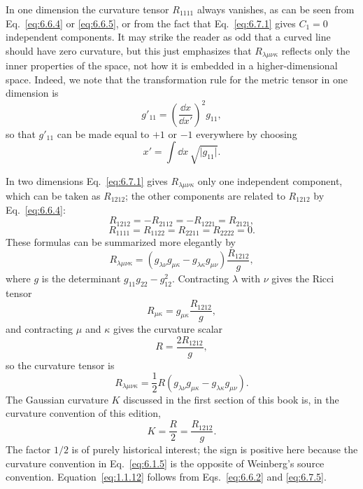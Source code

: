 In one dimension the curvature tensor \(R_{1111}\) always vanishes, as can
be seen from Eq.~\eqref{eq:6.6.4} or \eqref{eq:6.6.5}, or from the fact that
Eq.~\eqref{eq:6.7.1} gives \(C_1=0\) independent components. It may strike
the reader as odd that a curved line should have zero curvature, but this just
emphasizes that \(R_{\lambda\mu\nu\kappa}\) reflects only the inner
properties of the space, not how it is embedded in a higher-dimensional
space. Indeed, we note that the transformation rule for the metric tensor in
one dimension is
\[
  g'_{11}
  =
  \left(\frac{\dd x}{\dd x'}\right)^2g_{11},
\]
so that \(g'_{11}\) can be made equal to \(+1\) or \(-1\) everywhere by
choosing
\[
  x'=\int\dd x\,\sqrt{\lvert g_{11}\rvert}.
\]

In two dimensions Eq.~\eqref{eq:6.7.1} gives
\(R_{\lambda\mu\nu\kappa}\) only one independent component, which can be
taken as \(R_{1212}\); the other components are related to \(R_{1212}\) by
Eq.~\eqref{eq:6.6.4}:
\[
  R_{1212}
  =
  -R_{2112}
  =
  -R_{1221}
  =
  R_{2121},
\]
\[
  R_{1111}=R_{1122}=R_{2211}=R_{2222}=0.
\]
These formulas can be summarized more elegantly by
\[
  R_{\lambda\mu\nu\kappa}
  =
  (g_{\lambda\nu}g_{\mu\kappa}
   -g_{\lambda\kappa}g_{\mu\nu})
  \frac{R_{1212}}{g},
\]
where \(g\) is the determinant \(g_{11}g_{22}-g_{12}^2\). Contracting
\(\lambda\) with \(\nu\) gives the Ricci tensor
\begin{equation}
  R_{\mu\kappa}
  =
  g_{\mu\kappa}\frac{R_{1212}}{g},
  \tag{6.7.2}\label{eq:6.7.2}
\end{equation}
and contracting \(\mu\) and \(\kappa\) gives the curvature scalar
\begin{equation}
  R
  =
  \frac{2R_{1212}}{g},
  \tag{6.7.3}\label{eq:6.7.3}
\end{equation}
so the curvature tensor is
\begin{equation}
  R_{\lambda\mu\nu\kappa}
  =
  \frac12R
  (g_{\lambda\nu}g_{\mu\kappa}
   -g_{\lambda\kappa}g_{\mu\nu}).
  \tag{6.7.4}\label{eq:6.7.4}
\end{equation}
The Gaussian curvature \(K\) discussed in the first section of this book is,
in the curvature convention of this edition,
\begin{equation}
  K
  =
  \frac{R}{2}
  =
  \frac{R_{1212}}{g}.
  \tag{6.7.5}\label{eq:6.7.5}
\end{equation}
The factor \(1/2\) is of purely historical interest; the sign is positive
here because the curvature convention in Eq.~\eqref{eq:6.1.5} is the
opposite of Weinberg's source convention. Equation~\eqref{eq:1.1.12}
follows from Eqs.~\eqref{eq:6.6.2} and \eqref{eq:6.7.5}.

